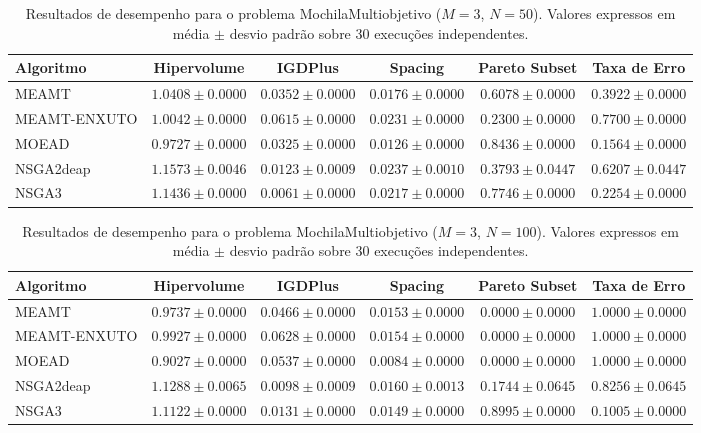\begin{table}[htpb]
\centering
\caption{Resultados de desempenho para o problema MochilaMultiobjetivo ($M=3$, $N=50$). Valores expressos em média $\pm$ desvio padrão sobre 30 execuções independentes.}
\label{tab:MochilaMultiobjetivo_M3_N50}
\begin{tabular}{lccccc}
\hline\hline
Algoritmo & Hipervolume & IGDPlus & Spacing & Pareto Subset & Taxa de Erro \\
\hline
MEAMT & $1.0408 \pm 0.0000$ & $0.0352 \pm 0.0000$ & $0.0176 \pm 0.0000$ & $0.6078 \pm 0.0000$ & $0.3922 \pm 0.0000$ \\
MEAMT-ENXUTO & $1.0042 \pm 0.0000$ & $0.0615 \pm 0.0000$ & $0.0231 \pm 0.0000$ & $0.2300 \pm 0.0000$ & $0.7700 \pm 0.0000$ \\
MOEAD & $0.9727 \pm 0.0000$ & $0.0325 \pm 0.0000$ & $0.0126 \pm 0.0000$ & $0.8436 \pm 0.0000$ & $0.1564 \pm 0.0000$ \\
NSGA2deap & $1.1573 \pm 0.0046$ & $0.0123 \pm 0.0009$ & $0.0237 \pm 0.0010$ & $0.3793 \pm 0.0447$ & $0.6207 \pm 0.0447$ \\
NSGA3 & $1.1436 \pm 0.0000$ & $0.0061 \pm 0.0000$ & $0.0217 \pm 0.0000$ & $0.7746 \pm 0.0000$ & $0.2254 \pm 0.0000$ \\
\hline\hline
\end{tabular}
\end{table}

\begin{table}[htpb]
\centering
\caption{Resultados de desempenho para o problema MochilaMultiobjetivo ($M=3$, $N=100$). Valores expressos em média $\pm$ desvio padrão sobre 30 execuções independentes.}
\label{tab:MochilaMultiobjetivo_M3_N100}
\begin{tabular}{lccccc}
\hline\hline
Algoritmo & Hipervolume & IGDPlus & Spacing & Pareto Subset & Taxa de Erro \\
\hline
MEAMT & $0.9737 \pm 0.0000$ & $0.0466 \pm 0.0000$ & $0.0153 \pm 0.0000$ & $0.0000 \pm 0.0000$ & $1.0000 \pm 0.0000$ \\
MEAMT-ENXUTO & $0.9927 \pm 0.0000$ & $0.0628 \pm 0.0000$ & $0.0154 \pm 0.0000$ & $0.0000 \pm 0.0000$ & $1.0000 \pm 0.0000$ \\
MOEAD & $0.9027 \pm 0.0000$ & $0.0537 \pm 0.0000$ & $0.0084 \pm 0.0000$ & $0.0000 \pm 0.0000$ & $1.0000 \pm 0.0000$ \\
NSGA2deap & $1.1288 \pm 0.0065$ & $0.0098 \pm 0.0009$ & $0.0160 \pm 0.0013$ & $0.1744 \pm 0.0645$ & $0.8256 \pm 0.0645$ \\
NSGA3 & $1.1122 \pm 0.0000$ & $0.0131 \pm 0.0000$ & $0.0149 \pm 0.0000$ & $0.8995 \pm 0.0000$ & $0.1005 \pm 0.0000$ \\
\hline\hline
\end{tabular}
\end{table}

